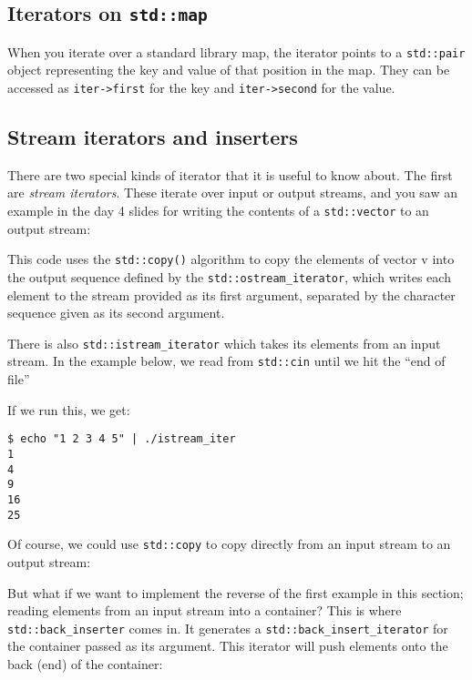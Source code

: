 \documentclass[a4paper]{scrartcl}
\begin{document}
\subsection{Iterators on \texttt{std::map}}
When you iterate over a standard library map, the iterator points to a \verb|std::pair| object representing the key and value of that position in the map. They can be accessed as \verb|iter->first| for the key and \verb|iter->second| for the value.

\subsection{Stream iterators and inserters}
There are two special kinds of iterator that it is useful to know about. The first are \emph{stream iterators}. These iterate over input or output streams, and you saw an example in the day 4 slides for writing the contents of a \verb|std::vector| to an output stream:



This code uses the \verb|std::copy()| algorithm to copy the elements of vector v into the output sequence defined by the \verb|std::ostream_iterator|, which writes each element to the stream provided as its first argument, separated by the character sequence given as its second argument.

There is also \verb|std::istream_iterator| which takes its elements from an input stream. In the example below, we read from \verb|std::cin| until we hit the ``end of file''



If we run this, we get:
\begin{verbatim}
$ echo "1 2 3 4 5" | ./istream_iter 
1
4
9
16
25
\end{verbatim}

Of course, we could use \verb|std::copy| to copy directly from an input stream to an output stream:



But what if we want to implement the reverse of the first example in this section; reading elements from an input stream into a container? This is where \verb|std::back_inserter| comes in. It generates a \verb|std::back_insert_iterator| for the container passed as its argument. This iterator will push elements onto the back (end) of the container:


\end{document}
